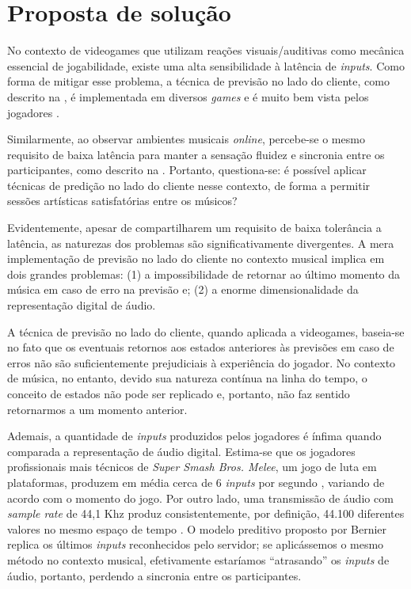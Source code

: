 \chapter{Proposta de solução}

No contexto de videogames que utilizam reações visuais/auditivas como mecânica essencial de jogabilidade, existe uma alta sensibilidade à latência de \textit{inputs}. Como forma de mitigar esse problema, a técnica de previsão no lado do cliente, como descrito na , é implementada em diversos \textit{games} e é muito bem vista pelos jogadores \cite{rollback_success}.

Similarmente, ao observar ambientes musicais \textit{online}, percebe-se o mesmo requisito de baixa latência para manter a sensação fluidez e sincronia entre os participantes, como descrito na . Portanto, questiona-se: é possível aplicar técnicas de predição no lado do cliente nesse contexto, de forma a permitir sessões artísticas satisfatórias entre os músicos?

Evidentemente, apesar de compartilharem um requisito de baixa tolerância a latência, as naturezas dos problemas são significativamente divergentes. A mera implementação de previsão no lado do cliente no contexto musical implica em dois grandes problemas: (1) a impossibilidade de retornar ao último momento da música em caso de erro na previsão e; (2) a enorme dimensionalidade da representação digital de áudio.

A técnica de previsão no lado do cliente, quando aplicada a videogames, baseia-se no fato que os eventuais retornos aos estados anteriores às previsões em caso de erros não são suficientemente prejudiciais à experiência do jogador. No contexto de música, no entanto, devido sua natureza contínua na linha do tempo, o conceito de estados não pode ser replicado e, portanto, não faz sentido retornarmos a um momento anterior.
 
Ademais, a quantidade de \textit{inputs} produzidos pelos jogadores é ínfima quando comparada a representação de áudio digital. Estima-se que os jogadores profissionais mais técnicos de \textit{Super Smash Bros. Melee}, um jogo de luta em plataformas, produzem em média cerca de 6 \textit{inputs} por segundo \cite{melee_inputs_per_second}, variando de acordo com o momento do jogo. Por outro lado, uma transmissão de áudio com \textit{sample rate} de 44,1 Khz produz consistentemente, por definição, 44.100 diferentes valores no mesmo espaço de tempo \cite{jukebox_dimension}. O modelo preditivo proposto por Bernier \cite{client-side-prediction} replica os últimos \textit{inputs} reconhecidos pelo servidor; se aplicássemos o mesmo método no contexto musical, efetivamente estaríamos ``atrasando'' os \textit{inputs} de áudio, portanto, perdendo a sincronia entre os participantes.

